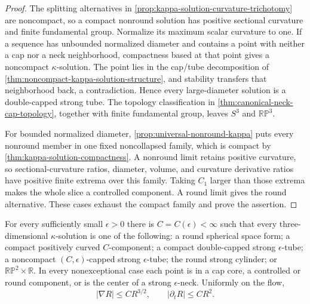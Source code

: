 \begin{proof}
The splitting alternatives in
\ref{prop:kappa-solution-curvature-trichotomy} are noncompact, so a compact
nonround solution has positive sectional curvature and finite fundamental
group.  Normalize its maximum scalar curvature to one.  If a sequence has
unbounded normalized diameter and contains a point with neither a cap nor a
neck neighborhood, compactness based at that point gives a noncompact
$\kappa$-solution.  The point lies in the cap/tube decomposition of
\ref{thm:noncompact-kappa-solution-structure}, and stability transfers that
neighborhood back, a contradiction.  Hence every large-diameter solution is
a double-capped strong tube.  The topology classification in
\ref{thm:canonical-neck-cap-topology}, together with finite fundamental
group, leaves $S^3$ and $\mathbb{RP}^3$.

For bounded normalized diameter,
\ref{prop:universal-nonround-kappa} puts every nonround member in one fixed
noncollapsed family, which is compact by
\ref{thm:kappa-solution-compactness}.  A nonround limit retains positive
curvature, so sectional-curvature ratios, diameter, volume, and curvature
derivative ratios have positive finite extrema over this family.  Taking
$C_1$ larger than those extrema makes the whole slice a controlled
component.  A round limit gives the round alternative.  These cases exhaust
the compact family and prove the assertion.
\end{proof}

\begin{theorem}
\label{thm:kappa-solution-structure-summary}
\notready
For every sufficiently small $\epsilon>0$ there is
$C=C(\epsilon)<\infty$ such that every three-dimensional
$\kappa$-solution is one of the following: a round spherical space form; a
compact positively curved $C$-component; a compact double-capped strong
$\epsilon$-tube; a noncompact $(C,\epsilon)$-capped strong
$\epsilon$-tube; the round strong cylinder; or
$\mathbb{RP}^2\times\mathbb R$.  In every nonexceptional case each point is
in a cap core, a controlled or round component, or is the center of a strong
$\epsilon$-neck.  Uniformly on the flow,
\[
 |\nabla R|\le CR^{3/2},\qquad |\partial_tR|\le CR^2.
\]
\end{theorem}

